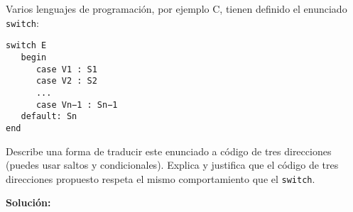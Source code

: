 Varios lenguajes de programaci\'on, por ejemplo \textsc{C}, tienen 
definido el enunciado \texttt{switch}:
\begin{verbatim}
switch E
   begin
      case V1 : S1
      case V2 : S2
      ...
      case Vn−1 : Sn−1
   default: Sn
end
\end{verbatim}
Describe una forma de traducir este enunciado a c\'odigo de tres direcciones 
(puedes usar saltos y condicionales).
Explica y justifica que el c\'odigo de tres direcciones propuesto respeta el 
mismo comportamiento que el \texttt{switch}.\newline

\textbf{Solución:} 

